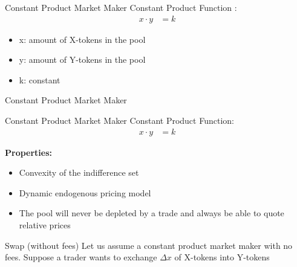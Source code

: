 \documentclass[]{beamer}
\begin{document}
\begin{frame}{Constant Product Market Maker}
Constant Product Function \cite{UNIV2}:
	\begin{align*}
		x \cdot y &= k
	\end{align*}

	\begin{itemize}
		\item[] x: amount of X-tokens in the pool
		\item[] y: amount of Y-tokens in the pool
		\item[] k: constant
	\end{itemize}
	\vspace{1cm}
\end{frame}


\begin{frame}{Constant Product Market Maker}
	\begin{figure}[h!]
		\begin{center}
			
		\end{center}
	\end{figure}
\end{frame}


\begin{frame}{Constant Product Market Maker}
Constant Product Function:
	\begin{align*}
		x \cdot y &= k
	\end{align*}
	
	\textbf{Properties:}
	\begin{itemize}
		\item<1-> Convexity of the indifference set
		\item<2-> Dynamic endogenous pricing model
		\item<3-> The pool will never be depleted by a trade and always be able to quote relative prices
	\end{itemize}
\end{frame}

\begin{frame}{Swap (without fees)}
	Let us assume a constant product market maker with no fees. Suppose a trader wants to exchange $\Delta x$ of X-tokens into Y-tokens
	\vspace{0.5cm}
	\begin{figure}[h!]
		\begin{center}
			
		\end{center}
	\end{figure}	
\end{frame}
\end{document}
